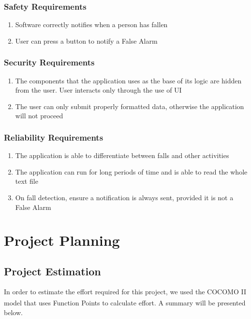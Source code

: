 \documentclass[hidelinks,conference,12pt]{IEEETran}
\begin{document}
\subsubsection{Safety Requirements}

\begin{enumerate}
	\item Software correctly notifies when a person has fallen
	\item User can press a button to notify a False Alarm
\end{enumerate}

\subsubsection{Security Requirements}

\begin{enumerate}
	\item The components that the application uses as the base of its logic are hidden from the user. User interacts only through the use of UI
	\item The user can only submit properly formatted data, otherwise the application will not proceed
\end{enumerate}

\subsubsection{Reliability Requirements}

\begin{enumerate}
	\item The application is able to differentiate between falls and other activities
	\item The application can run for long periods of time and is able to read the whole text file
	\item On fall detection, ensure a notification is always sent, provided it is not a False Alarm
\end{enumerate}

\section{Project Planning}

\subsection{Project Estimation}
In order to estimate the effort required for this project, we used the COCOMO II model\textsuperscript{\cite{cocomo}} that uses Function Points\textsuperscript{\cite{albrecht}} to calculate effort. A summary will be presented below.
\end{document}
